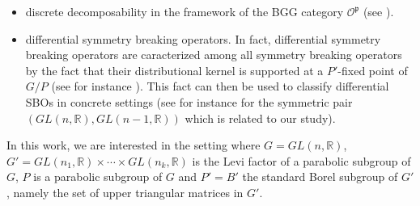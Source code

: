 \documentclass[pdftex]{sigma}
\numberwithin{equation}{section}
\theoremstyle{definition}
\newcommand{\R}{\mathbb{R}}
\newcommand{\V}{\mathcal{V}}
\newcommand{\W}{\mathcal{W}}
\newcommand{\p}{\mathfrak{p}}
\newcommand{\supp}{\mathrm{supp}}
\theoremstyle{plain}
\theoremstyle{plain}
\theoremstyle{plain}
\theoremstyle{plain}
\begin{document}
\begin{itemize}[leftmargin=*, label = --, noitemsep, nolistsep]
	\item discrete decomposability in the framework of the BGG category $\mathcal O^\p$ (see \cite{KobayashiVerma}).
	
	\item differential symmetry breaking operators. In fact, differential symmetry breaking operators are caracterized among all symmetry breaking operators by the fact that their distributional kernel is supported at a $P'$-fixed point of $G/P$ (see for instance \cite[Lemma $2.22$]{fmethod}). This fact can then be used to classify differential SBOs in concrete settings (see for instance \cite{DitlevsenLabriet} for the symmetric pair $(GL(n,\R),GL(n-1,\R))$ which is related to our study).
\end{itemize}

\medskip

In this work, we are interested in the setting where $G = GL(n,\R)$, $G'= GL(n_1,\R) \times \cdots \times GL(n_k,\R)$ is the Levi factor of a parabolic subgroup of $G$, $P$ is a parabolic subgroup of $G$ and $P'= B'$ the standard Borel subgroup of $G'$, namely the set of upper triangular matrices in $G'$.
\end{document}
